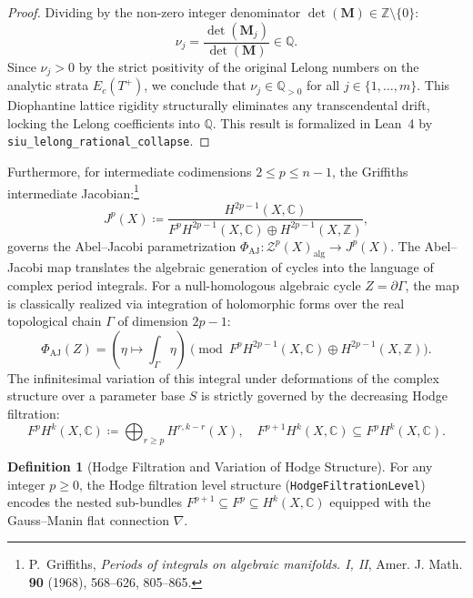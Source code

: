 \documentclass[11pt,a4paper]{article}
\theoremstyle{definition}
\newtheorem{definition}{Definition}[section]
\theoremstyle{plain}
\begin{document}
\begin{proof}
Dividing by the non-zero integer denominator $\det(\mathbf{M}) \in \mathbb{Z} \setminus \{0\}$:
\begin{equation}
    \nu_j = \frac{\det(\mathbf{M}_j)}{\det(\mathbf{M})} \in \mathbb{Q}.
\end{equation}
Since $\nu_j > 0$ by the strict positivity of the original Lelong numbers on the analytic strata $E_c(T^+)$, we conclude that $\nu_j \in \mathbb{Q}_{>0}$ for all $j \in \{1, \dots, m\}$. This Diophantine lattice rigidity structurally eliminates any transcendental drift, locking the Lelong coefficients into $\mathbb{Q}$. This result is formalized in Lean~4 by \texttt{siu\_lelong\_rational\_collapse}.
\end{proof}

Furthermore, for intermediate codimensions $2 \le p \le n-1$, the Griffiths intermediate Jacobian:\footnote{P.~Griffiths, \emph{Periods of integrals on algebraic manifolds. I, II}, Amer. J. Math. \textbf{90} (1968), 568--626, 805--865.}
\begin{equation}
    \label{eq:intermediate_jacobian}
    J^p(X) \coloneqq \frac{H^{2p-1}(X, \mathbb{C})}{F^p H^{2p-1}(X, \mathbb{C}) \oplus H^{2p-1}(X, \mathbb{Z})},
\end{equation}
governs the Abel--Jacobi parametrization $\Phi_{\mathrm{AJ}}: \mathcal{Z}^p(X)_{\mathrm{alg}} \to J^p(X)$. The Abel--Jacobi map translates the algebraic generation of cycles into the language of complex period integrals. For a null-homologous algebraic cycle $Z = \partial \Gamma$, the map is classically realized via integration of holomorphic forms over the real topological chain $\Gamma$ of dimension $2p-1$:
\begin{equation}
    \label{eq:abel_jacobi_integral}
    \Phi_{\mathrm{AJ}}(Z) = \left( \eta \longmapsto \int_{\Gamma} \eta \right) \pmod{F^p H^{2p-1}(X, \mathbb{C}) \oplus H^{2p-1}(X, \mathbb{Z})}.
\end{equation}
The infinitesimal variation of this integral under deformations of the complex structure over a parameter base $S$ is strictly governed by the decreasing Hodge filtration:
\begin{equation}
    \label{eq:hodge_filtration_def}
    F^p H^k(X, \mathbb{C}) \coloneqq \bigoplus_{r \ge p} H^{r, k-r}(X), \quad F^{p+1} H^k(X, \mathbb{C}) \subseteq F^p H^k(X, \mathbb{C}).
\end{equation}

\begin{definition}[Hodge Filtration and Variation of Hodge Structure]
\label{def:hodge_filtration_level}
For any integer $p \ge 0$, the Hodge filtration level structure (\texttt{HodgeFiltrationLevel}) encodes the nested sub-bundles $F^{p+1} \subseteq F^p \subseteq H^k(X, \mathbb{C})$ equipped with the Gauss--Manin flat connection $\nabla$.
\end{definition}
\end{document}
